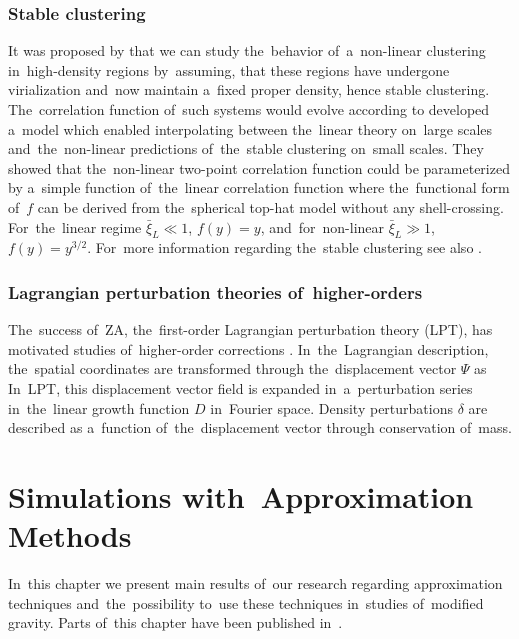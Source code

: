 \subsection{Stable clustering}
It was proposed by \textcite{1974ApJ...189L..51P} that we can study the~behavior of~a~non-linear clustering in~high-density regions by~assuming, that these regions have undergone virialization and~now maintain a~fixed proper density, hence stable clustering. The~correlation function of~such systems would evolve according to
\textcite{1991ApJ...374L...1H} developed a~model which enabled interpolating between the~linear theory on~large scales and~the~non-linear predictions of~the~stable clustering on~small scales. They showed that the~non-linear two-point correlation function could be parameterized by a~simple function of~the~linear correlation function
where the~functional form of~$f$ can be derived from the~spherical top-hat model without any shell-crossing. For~the~linear regime $\bar\xi_{L}\ll1$, $f(y)=y$, and~for~non-linear $\bar\xi_{L}\gg1$, $f(y)=y^{3/2}$. For~more information regarding the~stable clustering see  also \textcite{1996MNRAS.280L..19P,2003MNRAS.341.1311S}.
\subsection{Lagrangian perturbation theories of~higher-orders}
The~success of~ZA, the~first-order Lagrangian perturbation theory (LPT), has motivated studies of~higher-order corrections \parencite[see e.g.][]{10.1093/mnras/264.2.375,2002PhR...367....1B,2010MNRAS.403.1859J,2014ApJ...788...63S}. In~the~Lagrangian description, the~spatial coordinates are transformed through the~displacement vector $\Psi$ as
In~LPT, this displacement vector field is expanded in~a~perturbation series in~the~linear growth function $D$ in~Fourier space. Density perturbations $\delta$ are described as a~function of~the~displacement vector through conservation of~mass.\clearpage{}
\clearpage{}\chapter{Simulations with~Approximation Methods}
\label{chpt:app_sims}
In~this chapter we present main results of~our research regarding approximation techniques and~the~possibility to~use these techniques in~studies of~modified gravity. Parts of~this chapter have been published in~\textcite{2020MNRAS.493.2085V}.

